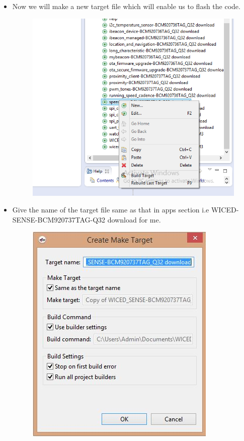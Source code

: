 \documentclass[11pt,a4paper]{article}
\begin{document}
\begin{itemize}
	\newpage
	
	\item Now we will make a new target file which will enable us to flash the code.
	\begin{figure}[h]
    \centering
	\includegraphics[scale=0.6]{newtarget.png}
	\end{figure}
	
		\item Give the name of the target file same as that in apps section i.e {WICED-SENSE-BCM920737TAG-Q32} download for me.
		\begin{figure}[h]
    \centering
	\includegraphics[scale=0.6]{createmaketarget.JPG}
	\end{figure}
	


\end{itemize}
\end{document}
